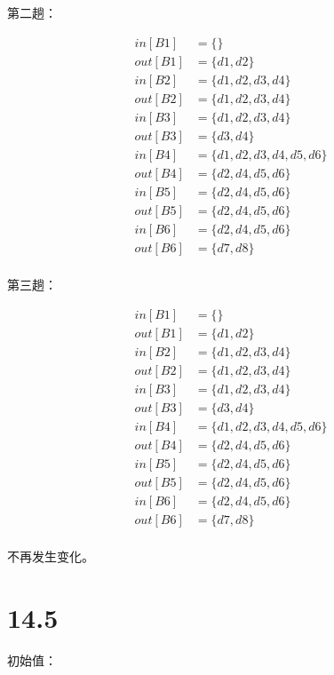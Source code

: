 \documentclass[UTF8]{ctexart}
\begin{document}
第二趟：

\begin{align*}
    in[B1] &= \{\} \\
    out[B1] &= \{d1, d2\} \\
    in[B2] &= \{d1, d2, d3, d4\} \\
    out[B2] &= \{d1, d2, d3, d4\} \\
    in[B3] &= \{d1, d2, d3, d4\} \\
    out[B3] &= \{d3, d4\} \\
    in[B4] &= \{d1, d2, d3, d4, d5, d6\} \\
    out[B4] &= \{d2, d4, d5, d6\} \\
    in[B5] &= \{d2, d4, d5, d6\} \\
    out[B5] &= \{d2, d4, d5, d6\} \\
    in[B6] &= \{d2, d4, d5, d6\} \\
    out[B6] &= \{d7, d8\} \\
\end{align*}

第三趟：

\begin{align*}
    in[B1] &= \{\} \\
    out[B1] &= \{d1, d2\} \\
    in[B2] &= \{d1, d2, d3, d4\} \\
    out[B2] &= \{d1, d2, d3, d4\} \\
    in[B3] &= \{d1, d2, d3, d4\} \\
    out[B3] &= \{d3, d4\} \\
    in[B4] &= \{d1, d2, d3, d4, d5, d6\} \\
    out[B4] &= \{d2, d4, d5, d6\} \\
    in[B5] &= \{d2, d4, d5, d6\} \\
    out[B5] &= \{d2, d4, d5, d6\} \\
    in[B6] &= \{d2, d4, d5, d6\} \\
    out[B6] &= \{d7, d8\} \\
\end{align*}

不再发生变化。

\section*{14.5}

初始值：
\end{document}
